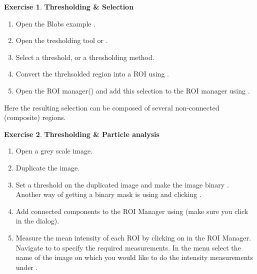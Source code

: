 \documentclass[xcolor=table,DIV=19,twocolumn]{scrartcl}
\theoremstyle{definition}
\newtheorem{exercice}{Exercise}
\begin{document}
\begin{exercice} \textbf{Thresholding \& Selection}
  \begin{enumerate}
  \item Open the Blobs example .
  \item Open the tresholding tool  or .
  \item Select a threshold, or a thresholding method.
  \item Convert the threhsolded region into a ROI using .
  \item Open the ROI manager() and add this selection to the ROI manager using .
  \end{enumerate}
  Here the resulting selection can be composed of several non-connected (composite) regions.
\end{exercice}

\begin{exercice} \textbf{Thresholding \& Particle analysis}
  \begin{enumerate}
  \item Open a grey scale image.
  \item Duplicate the image.
  \item Set a threshold on the duplicated image and make the image binary . Another way of getting a binary mask is using  and clicking .
  \item Add connected components to the ROI Manager using  (make sure you click  in the  dialog).
  \item Measure the mean intensity of each ROI by clicking on  in the ROI Manager. Navigate to  to specify the required measurements. In the  menu select the name of the image on which you would like to do the intensity measurements under .

  \end{enumerate}
\end{exercice}
\end{document}
